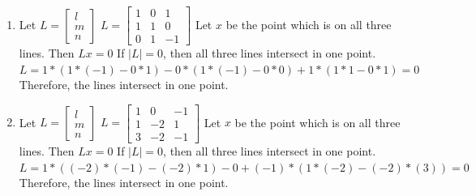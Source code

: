 \documentclass[11pt]{article}
\begin{document}
\begin{enumerate}
\begin{tcolorbox}
\begin{studentSpace}
\begin{enumerate}[]
    \item Let $L = \begin{bmatrix} l  \\ m \\ n \end{bmatrix} $ \newline
      $L = \begin{bmatrix} 1 & 0 & 1 \\ 1 & 1 & 0 \\ 0 & 1 & -1 \end{bmatrix}$ \newline
      Let $x$ be the point which is on all three lines. Then $Lx=0$ \newline
      If $|L|=0$, then all three lines intersect in one point. \newline
      $ L = 1*(1*(-1) - 0*1) - 0*(1*(-1)-0*0) + 1*(1*1-0*1) = 0 $ \newline
    Therefore, the lines intersect in one point.

    \item Let $L = \begin{bmatrix} l  \\ m \\ n \end{bmatrix} $ \newline
      $L = \begin{bmatrix} 1 & 0 & -1 \\ 1 & -2 & 1 \\ 3 & -2 & -1 \end{bmatrix}$ \newline
      Let $x$ be the point which is on all three lines. Then $Lx=0$ \newline
      If $|L|=0$, then all three lines intersect in one point. \newline
      $ L = 1*((-2)*(-1)-(-2)*1) - 0 + (-1)*(1*(-2)-(-2)*(3)) = 0 $ \newline
    Therefore, the lines intersect in one point.

  \end{enumerate}
\end{studentSpace}
\end{tcolorbox}

\end{enumerate}
\end{document}
